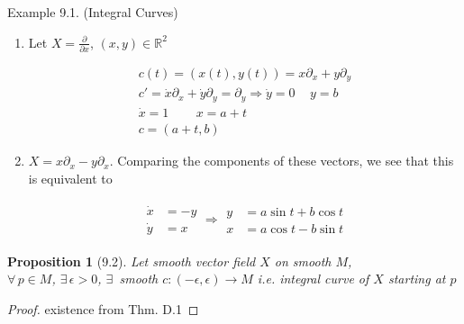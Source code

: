 \documentclass[11pt]{amsart}
\newtheorem{proposition}{Proposition}
\theoremstyle{definition}
\begin{document}
Example 9.1.  (Integral Curves)

\begin{enumerate}
\item[(a)] Let $X = \frac{ \partial }{ \partial x}$, $(x,y) \in \mathbb{R}^2$

\[
\begin{gathered}
  c(t) = (x(t), y(t)) = x \partial_x + y\partial_y \\
  c' = \dot{x} \partial_x + \dot{y} \partial_y = \partial_y   \Longrightarrow \dot{y} = 0 \quad \, y = b \\
  \dot{x} = 1 \quad \quad \, x = a+t \\
  c = (a+t ,b)
\end{gathered}
\]


\item[(b)] $X = x\partial_x - y \partial_x$.  Comparing the components of these vectors, we see that this is equivalent to

\[
\begin{gathered}
  \begin{aligned}
    \dot{x} & = -y \\
    \dot{y}  & = x \end{aligned} \Longrightarrow \begin{aligned}
    y & = a \sin{t} + b\cos{t} \\
    x & = a\cos{t} - b\sin{t} \end{aligned}
\end{gathered}
\]



\end{enumerate}


\begin{proposition}[9.2] Let smooth vector field $X$ on smooth $M$, \\
$\forall \, p \in M$, $\exists \, \epsilon > 0 $, $\exists \, $ smooth $c:(-\epsilon, \epsilon) \to M$ i.e. integral curve of $X$ starting at $p$ \end{proposition}

\begin{proof}
  existence from Thm. D.1
\end{proof}
\end{document}
